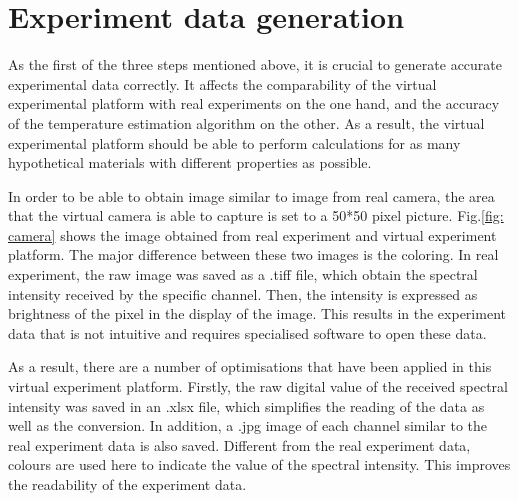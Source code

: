 \section{Experiment data generation}
As the first of the three steps mentioned above, it is crucial to generate 
accurate experimental data correctly. It affects the comparability of the 
virtual experimental platform with real experiments on the one hand, and 
the accuracy of the temperature estimation algorithm on the other. As a 
result, the virtual experimental platform should be able to perform 
calculations for as many hypothetical materials with different properties 
as possible.


In order to be able to obtain image similar to image from
real camera, the area that the virtual camera is able to capture is 
set to a 50*50 pixel picture. Fig.\ref{fig: camera} shows the image obtained 
from real experiment and virtual experiment platform. The major difference between 
these two images is the coloring. In real experiment, the raw image was saved 
as a .tiff file, which obtain the spectral intensity received by the specific 
channel. Then, the intensity is expressed as brightness of the pixel in the display of 
the image. This results in the experiment data that is not intuitive and 
requires specialised software to open these data.


As a result, there are a number of optimisations that have been applied 
in this virtual experiment platform. Firstly, the raw digital value 
of the received spectral intensity was saved in an .xlsx file, which 
simplifies the reading of the data as well as the conversion. In 
addition, a .jpg image of each channel similar to the real experiment data is also 
saved. Different from the real experiment data, colours are used here to 
indicate the value of the spectral intensity. This improves the 
readability of the experiment data.


